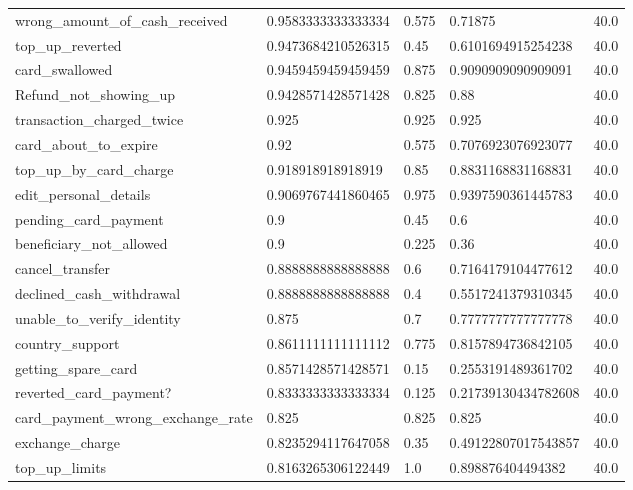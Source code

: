 \begin{table}[!ht]
\begin{tabularx}{\textwidth}{X l l l l}
wrong\_amount\_of\_cash\_received & \num{0.9583333333333334} & \num{0.575} & \num{0.71875} & \num{40.0} \\
top\_up\_reverted & \num{0.9473684210526315} & \num{0.45} & \num{0.6101694915254238} & \num{40.0} \\
card\_swallowed & \num{0.9459459459459459} & \num{0.875} & \num{0.9090909090909091} & \num{40.0} \\
Refund\_not\_showing\_up & \num{0.9428571428571428} & \num{0.825} & \num{0.88} & \num{40.0} \\
transaction\_charged\_twice & \num{0.925} & \num{0.925} & \num{0.925} & \num{40.0} \\
card\_about\_to\_expire & \num{0.92} & \num{0.575} & \num{0.7076923076923077} & \num{40.0} \\
top\_up\_by\_card\_charge & \num{0.918918918918919} & \num{0.85} & \num{0.8831168831168831} & \num{40.0} \\
edit\_personal\_details & \num{0.9069767441860465} & \num{0.975} & \num{0.9397590361445783} & \num{40.0} \\
pending\_card\_payment & \num{0.9} & \num{0.45} & \num{0.6} & \num{40.0} \\
beneficiary\_not\_allowed & \num{0.9} & \num{0.225} & \num{0.36} & \num{40.0} \\
cancel\_transfer & \num{0.8888888888888888} & \num{0.6} & \num{0.7164179104477612} & \num{40.0} \\
declined\_cash\_withdrawal & \num{0.8888888888888888} & \num{0.4} & \num{0.5517241379310345} & \num{40.0} \\
unable\_to\_verify\_identity & \num{0.875} & \num{0.7} & \num{0.7777777777777778} & \num{40.0} \\
country\_support & \num{0.8611111111111112} & \num{0.775} & \num{0.8157894736842105} & \num{40.0} \\
getting\_spare\_card & \num{0.8571428571428571} & \num{0.15} & \num{0.2553191489361702} & \num{40.0} \\
reverted\_card\_payment? & \num{0.8333333333333334} & \num{0.125} & \num{0.21739130434782608} & \num{40.0} \\
card\_payment\_wrong\_exchange\_rate & \num{0.825} & \num{0.825} & \num{0.825} & \num{40.0} \\
exchange\_charge & \num{0.8235294117647058} & \num{0.35} & \num{0.49122807017543857} & \num{40.0} \\
top\_up\_limits & \num{0.8163265306122449} & \num{1.0} & \num{0.898876404494382} & \num{40.0} \\

\end{tabularx}
\end{table}
